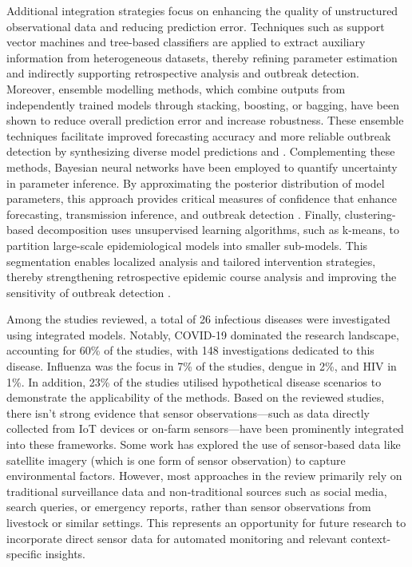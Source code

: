 Additional integration strategies focus on enhancing the quality of unstructured observational data and reducing prediction error. Techniques such as support vector machines and tree-based classifiers are applied to extract auxiliary information from heterogeneous datasets, thereby refining parameter estimation and indirectly supporting retrospective analysis and outbreak detection. Moreover, ensemble modelling methods, which combine outputs from independently trained models through stacking, boosting, or bagging, have been shown to reduce overall prediction error and increase robustness. These ensemble techniques facilitate improved forecasting accuracy and more reliable outbreak detection by synthesizing diverse model predictions \cite{tuarob_modeling_2015,solares-hernandez_adaptation_2023,rosato_extracting_2023,kandula_improved_2019} and 
\cite{kandula_evaluation_2018,adiga_all_2021,nadler_neural_2020,maniamfu_lstm-based_2023,adiga_enhancing_2022,delli_compagni_hybrid_2022}. Complementing these methods, Bayesian neural networks have been employed to quantify uncertainty in parameter inference. By approximating the posterior distribution of model parameters, this approach provides critical measures of confidence that enhance forecasting, transmission inference, and outbreak detection \cite{ryder2018blackboxvariationalinferencestochastic, ARNST2022108805, 10.1371/journal.pcbi.1005416, 10.1371/journal.pcbi.1009472}. Finally, clustering-based decomposition uses unsupervised learning algorithms, such as k-means, to partition large-scale epidemiological models into smaller sub-models. This segmentation enables localized analysis and tailored intervention strategies, thereby strengthening retrospective epidemic course analysis and improving the sensitivity of outbreak detection \cite{bertozzi-villa_archetypes_2023}.

Among the studies reviewed, a total of 26 infectious diseases were investigated using integrated models. Notably, COVID-19 dominated the research landscape, accounting for 60\% of the studies, with 148 investigations dedicated to this disease. Influenza was the focus in 7\% of the studies, dengue in 2\%, and HIV in 1\%. In addition, 23\% of the studies utilised hypothetical disease scenarios to demonstrate the applicability of the methods. Based on the reviewed studies, there isn’t strong evidence that sensor observations—such as data directly collected from IoT devices or on‐farm sensors—have been prominently integrated into these frameworks. Some work has explored the use of sensor‐based data like satellite imagery (which is one form of sensor observation) to capture environmental factors. However, most approaches in the review primarily rely on traditional surveillance data and non‑traditional sources such as social media, search queries, or emergency reports, rather than sensor observations from livestock or similar settings. This represents an opportunity for future research to incorporate direct sensor data for automated monitoring and relevant context-specific insights.


